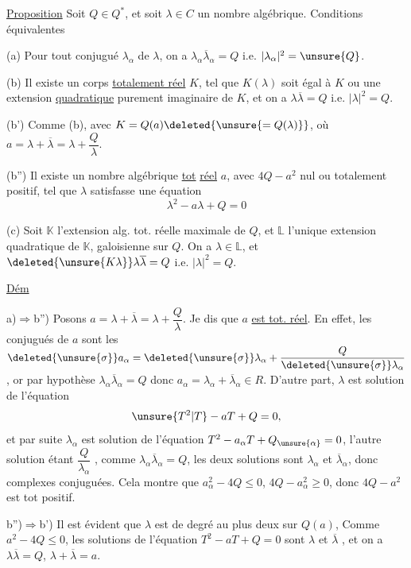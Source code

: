 \uline{Proposition} Soit $Q\in Q^*$, et soit $\lambda\in C$ un nombre algébrique. Conditions équivalentes

(a) Pour tout conjugué $\lambda_\alpha$ de $\lambda$, on a $\lambda_\alpha\overline\lambda_\alpha=Q$ i.e. $|\lambda_\alpha|^2=\unsure{Q}$.

(b)  Il existe un corps  \uline{totalement réel} $K$, tel que  $K(\lambda)$ soit égal à $K$ ou une extension \uline{quadratique} purement imaginaire de $K$, et on a $\lambda\overline\lambda=Q$ i.e. $|\lambda|^2=Q$.

(b') Comme (b), avec $K=Q(a)\deleted{\unsure{=Q(\lambda)}}$, où $a=\lambda+\overline\lambda=\lambda+\dfrac Q\lambda$.

(b'') Il existe un nombre algébrique  \uline{tot} \uline{réel} $a$, avec  $4Q-a^2$ nul ou totalement positif, tel que $\lambda$ satisfasse une équation
\[
\lambda^2-a\lambda+Q=0
\]

(c) Soit $\mathbb K$ l'extension alg. tot. réelle maximale de $Q$, et $\mathbb L$ l'unique extension quadratique de $\mathbb K$, galoisienne sur $Q$. On a $\lambda\in\mathbb L$, et $\deleted{\unsure{K\lambda}}\lambda\overline\lambda=Q$ i.e. $|\lambda|^2=Q$.

\uline{Dém}

a)$\Longrightarrow$b'') Posons $a=\lambda+\overline\lambda=\lambda+\dfrac Q\lambda$. Je dis que $a$ \uline{est tot. réel}. En effet, les conjugués de $a$ sont les $\deleted{\unsure{\sigma}}a_\alpha=\deleted{\unsure{\sigma}}\lambda_\alpha+\dfrac Q{\deleted{\unsure{\sigma}}\lambda_\alpha}$, or par hypothèse $\lambda_\alpha\overline\lambda_\alpha=Q$ donc $a_\alpha=\lambda_\alpha+\overline\lambda_\alpha\in R$. D'autre part, $\lambda$ est solution de l'équation
\[
\unsure{T^2|T}-aT+Q=0,
\]
et par suite $\lambda_\alpha$ est solution de l'équation $T^2-a_\alpha T+Q_{\unsure{\alpha}}=0$,  l'autre solution étant $\dfrac Q{\lambda_\alpha}$ ,  comme $\lambda_\alpha\overline\lambda_\alpha=Q$, les deux solutions sont $\lambda_\alpha$ et $\overline\lambda_\alpha$, donc complexes conjuguées. Cela montre que $a_\alpha^2-4Q\le0$,   $4Q-a_\alpha^2\ge0$, donc $4Q-a^2$ est tot positif.

b'')$\Longrightarrow$b') Il est évident que $\lambda$ est de degré au plus deux sur  $Q(a)$,     Comme $a^2-4Q\le0$, les solutions de l'équation $T^2-aT+Q=0$ sont $\lambda$ et $\overline\lambda$ , et on a $\lambda\overline\lambda=Q$, $\lambda+\overline\lambda=a$.
